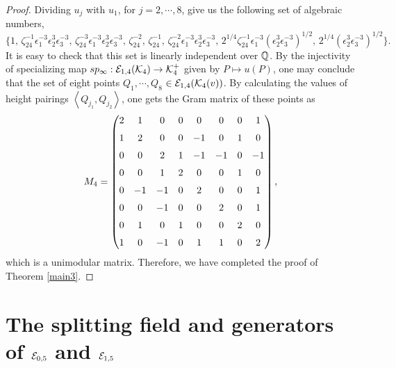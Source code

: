 \documentclass[11pt]{amsart}
\begin{document}
\begin{proof}
	Dividing $u_j$ with $u_1$, for $j=2,\cdots, 8$, give us the following set of algebraic  numbers,
	$$\{ 1,\, \zeta_{24}^{-1} \epsilon_1^{-3} \epsilon_2^3 \epsilon_3^{-3},\,
	\zeta_{24}^{-3}\epsilon_1^{-3}\epsilon_2^3 \epsilon_3^{-3},\,\zeta_{24}^{-2},\, \zeta_{24}^{-1},\,  
	\zeta_{24}^{-2} \epsilon_1^{-3} \epsilon_2^3 \epsilon_3^{-3},\,
	2^{1/4} \zeta_{24}^{-1} \epsilon_1^{-3} (\epsilon_2^3 \epsilon_3^{-3})^{1/2},\,
	2^{1/4}  (\epsilon_2^3 \epsilon_3^{-3})^{1/2} \}.$$
	It is easy to check that  this set is linearly independent over ${\mathbb Q}$. 
	By the injectivity of  specializing map $sp_\infty: {\mathcal E}_{1,4}({\mathcal K}_4) \rightarrow {\mathcal K}_4^+$ given by $P \mapsto u(P)$, one may conclude that the set of eight points $Q_1,\cdots, Q_8$
	$\in {\mathcal E}_{1, 4}({\mathcal K}_4(v))$.
	 	By calculating the values of  height pairings  $\left\langle  Q_{j_1}, Q_{j_2}\right\rangle $, one gets the Gram matrix of these points as
	\[M_4 = \begin{pmatrix}
	2   & 1  & 0  & 0  & 0  & 0  & 0  & 1\\ \noalign{\medskip}
	1   & 2  & 0  & 0  & -1  & 0  & 1  & 0\\ \noalign{\medskip}
	0   & 0  & 2  & 1  & -1  & -1  & 0  & -1	\\ \noalign{\medskip}
	0   & 0  & 1  & 2  & 0  & 0  & 1  & 0\\ \noalign{\medskip}
	0   & -1  & -1  & 0  & 2  & 0  & 0  & 1\\ \noalign{\medskip}
	0  & 0  & -1  & 0  & 0  & 2  & 0  & 1\\ \noalign{\medskip}
	0  & 1  & 0  & 1  & 0  & 0  & 2  & 0\\ \noalign{\medskip}
	1  & 0  & -1  & 0  & 1  & 1  & 0  & 2
	\end{pmatrix}, \]  
	which  is a unimodular matrix. Therefore, we have completed  the proof of Theorem \ref{main3}.
\end{proof}	


\section{The  splitting field and generators of  ${\mathcal E}_{0,5}$ and ${\mathcal E}_{1,5}$}
\label{E-{0,5}}
\end{document}
